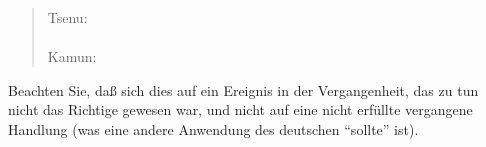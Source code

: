 \begin{quotation}
\noindent Tsenu: \\
\noindent{} \\

\noindent Kamun: \\
\noindent{}
\end{quotation}

\noindent Beachten Sie, da\ss{} sich dies auf ein Ereignis in der Vergangenheit, das zu tun
nicht das Richtige gewesen war, und nicht auf eine nicht erf\"ullte vergangene Handlung (was
eine andere Anwendung des deutschen "`sollte"' ist).
